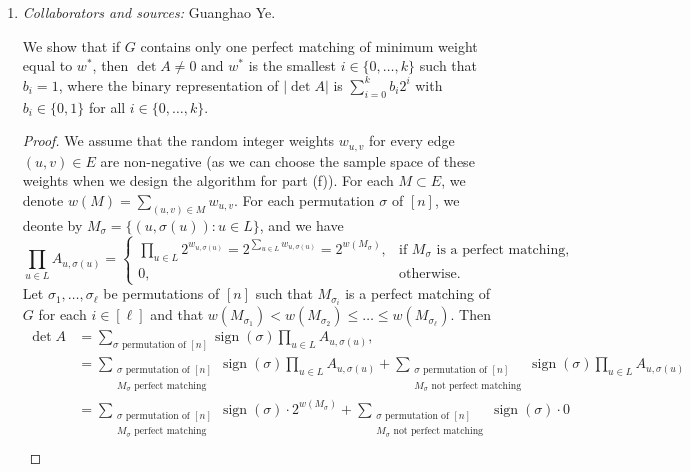 \documentclass[letterpaper, reqno,11pt]{article}
\DeclareMathOperator{\sign}{sign}
\begin{document}
\begin{enumerate}
\begin{enumerate}
    \item \noindent\emph{Collaborators and sources:} Guanghao Ye.

    \bigskip

    We show that if $G$ contains only one perfect matching of minimum weight equal to $w^*$, then $\det A \neq 0$ and $w^*$ is the smallest $i \in \{ 0, \ldots, k \}$ such that $b_i = 1$, where the binary representation of $|\det A|$ is $\sum_{i = 0}^k b_i 2^i$ with $b_i \in \{ 0, 1 \}$ for all $i \in \{ 0, \ldots, k \}$.

    \begin{proof}
      We assume that the random integer weights $w_{u, v}$ for every edge $(u, v) \in E$ are non-negative (as we can choose the sample space of these weights when we design the algorithm for part (f)). For each $M \subset E$, we denote $w(M) = \sum_{(u, v) \in M} w_{u, v}$. For each permutation $\sigma$ of $[n]$, we deonte by $M_\sigma = \{ (u, \sigma(u)) : u \in L \}$, and we have
      $$ \prod_{u \in L} A_{u, \sigma(u)} = \left\{
        \begin{array}{ll}
          \prod_{u \in L} 2^{w_{u, \sigma(u)}} = 2^{\sum_{u \in L} w_{u, \sigma(u)}} = 2^{w\left(M_\sigma\right)}, & \text{if $M_\sigma$ is a perfect matching}, \\
          0, & \text{otherwise}.
        \end{array}
      \right. $$
      Let $\sigma_1, \ldots, \sigma_\ell$ be permutations of $[n]$ such that $M_{\sigma_i}$ is a perfect matching of $G$ for each $i \in [\ell]$ and that $w(M_{\sigma_1}) < w(M_{\sigma_2}) \leq \ldots \leq w(M_{\sigma_\ell})$. Then
      \begin{align*}
        \det A &= \sum_{\text{$\sigma$ permutation of $[n]$}} \sign(\sigma) \prod_{u \in L} A_{u, \sigma(u)}, \\
        &= \sum_{\substack{\text{$\sigma$ permutation of $[n]$} \\ \text{$M_\sigma$ perfect matching}}} \sign(\sigma) \prod_{u \in L} A_{u, \sigma(u)} + \sum_{\substack{\text{$\sigma$ permutation of $[n]$} \\ \text{$M_\sigma$ not perfect matching}}} \sign(\sigma) \prod_{u \in L} A_{u, \sigma(u)} \\
        &= \sum_{\substack{\text{$\sigma$ permutation of $[n]$} \\ \text{$M_\sigma$ perfect matching}}} \sign(\sigma) \cdot 2^{w\left(M_\sigma\right)} + \sum_{\substack{\text{$\sigma$ permutation of $[n]$} \\ \text{$M_\sigma$ not perfect matching}}} \sign(\sigma) \cdot 0 \\

\end{align*}
\end{proof}
\end{enumerate}
\end{enumerate}
\end{document}
